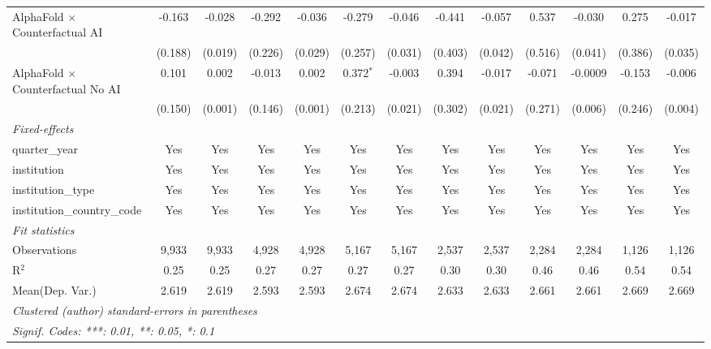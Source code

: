 \begin{tabular}{lcccccccccccc}
   AlphaFold $\times$ Counterfactual AI     & -0.163        & -0.028  & -0.292      & -0.036  & -0.279        & -0.046  & -0.441  & -0.057  & 0.537   & -0.030  & 0.275   & -0.017\\   
                                            & (0.188)       & (0.019) & (0.226)     & (0.029) & (0.257)       & (0.031) & (0.403) & (0.042) & (0.516) & (0.041) & (0.386) & (0.035)\\   
   AlphaFold $\times$ Counterfactual No AI  & 0.101         & 0.002   & -0.013      & 0.002   & 0.372$^{*}$   & -0.003  & 0.394   & -0.017  & -0.071  & -0.0009 & -0.153  & -0.006\\   
                                            & (0.150)       & (0.001) & (0.146)     & (0.001) & (0.213)       & (0.021) & (0.302) & (0.021) & (0.271) & (0.006) & (0.246) & (0.004)\\   
   \midrule
   \emph{Fixed-effects}\\
   quarter\_year                            & Yes           & Yes     & Yes         & Yes     & Yes           & Yes     & Yes     & Yes     & Yes     & Yes     & Yes     & Yes\\  
   institution                              & Yes           & Yes     & Yes         & Yes     & Yes           & Yes     & Yes     & Yes     & Yes     & Yes     & Yes     & Yes\\  
   institution\_type                        & Yes           & Yes     & Yes         & Yes     & Yes           & Yes     & Yes     & Yes     & Yes     & Yes     & Yes     & Yes\\  
   institution\_country\_code               & Yes           & Yes     & Yes         & Yes     & Yes           & Yes     & Yes     & Yes     & Yes     & Yes     & Yes     & Yes\\  
   \midrule
   \emph{Fit statistics}\\
   Observations                             & 9,933         & 9,933   & 4,928       & 4,928   & 5,167         & 5,167   & 2,537   & 2,537   & 2,284   & 2,284   & 1,126   & 1,126\\  
   R$^2$                                    & 0.25          & 0.25    & 0.27        & 0.27    & 0.27          & 0.27    & 0.30    & 0.30    & 0.46    & 0.46    & 0.54    & 0.54\\  
Mean(Dep. Var.) & 2.619 & 2.619 & 2.593 & 2.593 & 2.674 & 2.674 & 2.633 & 2.633 & 2.661 & 2.661 & 2.669 & 2.669 \\
   \midrule \midrule
   \multicolumn{13}{l}{\emph{Clustered (author) standard-errors in parentheses}}\\
   \multicolumn{13}{l}{\emph{Signif. Codes: ***: 0.01, **: 0.05, *: 0.1}}\\
\end{tabular}
\par\endgroup
